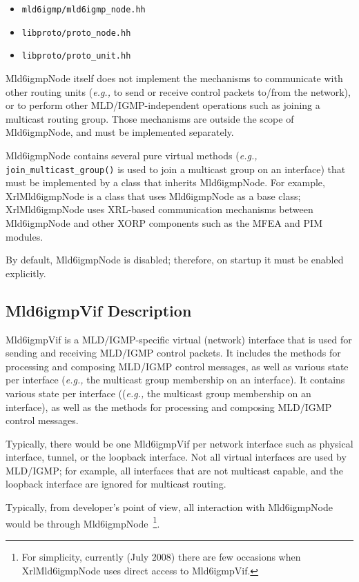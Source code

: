 \documentclass[11pt]{article}
\newcommand{\eg}{\emph{e.g.,}\xspace}
\begin{document}
\begin{itemize}
  \item \verb=mld6igmp/mld6igmp_node.hh=
  \item \verb=libproto/proto_node.hh=
  \item \verb=libproto/proto_unit.hh=
\end{itemize}

Mld6igmpNode itself does not implement the mechanisms to communicate with
other routing units (\eg to send or receive control packets to/from the
network), or to perform other MLD/IGMP-independent operations such as
joining a multicast routing group. Those mechanisms are outside the scope of
Mld6igmpNode, and must be implemented separately.

Mld6igmpNode contains several pure virtual methods (\eg
\verb=join_multicast_group()= is used to join a multicast group on
an interface) that must be implemented by a class that inherits Mld6igmpNode.
For example, XrlMld6igmpNode is a class that uses Mld6igmpNode as a base
class; XrlMld6igmpNode uses XRL-based communication mechanisms between
Mld6igmpNode and other XORP components such as the MFEA and PIM modules.

By default, Mld6igmpNode is disabled; therefore, on startup it must be
enabled explicitly.

\subsection{Mld6igmpVif Description}

Mld6igmpVif is a MLD/IGMP-specific virtual (network) interface that is
used for sending and receiving MLD/IGMP control packets. It includes the
methods for processing and composing MLD/IGMP control messages, as well
as various state per interface (\eg the multicast group membership on an
interface). It contains various state per interface ((\eg the multicast
group membership on an interface), as well as the methods for processing
and composing MLD/IGMP control messages.

Typically, there would be one Mld6igmpVif per network interface
such as physical interface, tunnel, or the loopback
interface. Not all virtual interfaces are
used by MLD/IGMP; for example, all interfaces that are not multicast
capable, and the loopback interface are ignored for multicast
routing.

Typically, from developer's point of view, all interaction with Mld6igmpNode
would be through Mld6igmpNode~\footnote{For simplicity, currently
(July 2008) there are few occasions when XrlMld6igmpNode uses
direct access to Mld6igmpVif.}.
\end{document}
